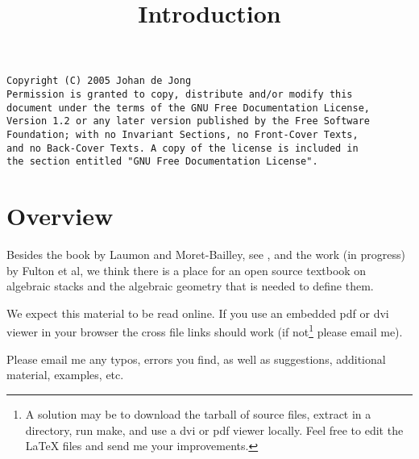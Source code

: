 

%


\title{Introduction}


\maketitle

\label{section-phantom}

\begin{verbatim}
Copyright (C) 2005 Johan de Jong
Permission is granted to copy, distribute and/or modify this
document under the terms of the GNU Free Documentation License,
Version 1.2 or any later version published by the Free Software
Foundation; with no Invariant Sections, no Front-Cover Texts,
and no Back-Cover Texts. A copy of the license is included in
the section entitled "GNU Free Documentation License".
\end{verbatim}

\tableofcontents

\section{Overview}
\label{section-overview}

\noindent
Besides the book by Laumon and Moret-Bailley, see \cite{LM-B}, and the work
(in progress) by Fulton et al, we think there is a place for an open source
textbook on algebraic stacks and the algebraic geometry that is needed
to define them.

\medskip\noindent
We expect this material to be read online. If you use an
embedded pdf or dvi viewer in your browser the cross file
links should work (if not\footnote{A solution may be
to download the tarball of source files, extract in a directory,
run make, and use a dvi or pdf viewer locally. Feel free to
edit the LaTeX files and send me your improvements.} please email me).

\medskip\noindent
Please email me any typos, errors you find, as well as suggestions,
additional material, examples, etc.







